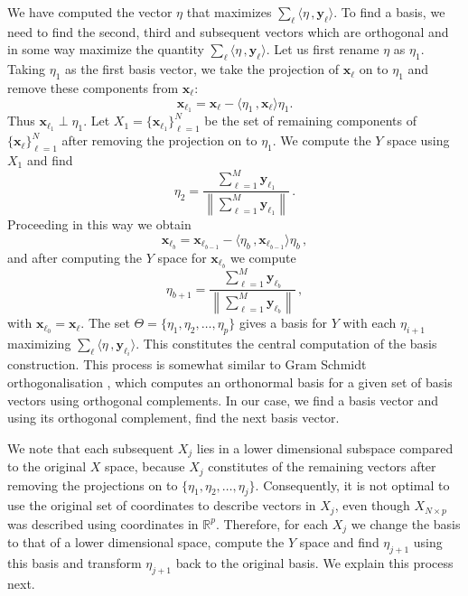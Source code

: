\documentclass[letter,12pt]{article}
\begin{document}
We have computed the vector $\eta$ that maximizes $\sum_{\ell}\langle \eta\, , \bm{y}_{\ell}\rangle$. To find a basis, we need to find the second, third and subsequent vectors which are orthogonal and in some way maximize the quantity $\sum_{\ell}\langle \eta\, , \bm{y}_{\ell}\rangle$. Let us first rename $\eta$ as $\eta_1$. {\color{blue} Taking $\eta_1$ as the first basis vector, we take the projection of $\bm{x}_\ell$ on to $\eta_1$ and remove these components from $\bm{x}_\ell$: 
\begin{equation}\label{eq:secMF10}
	\bm{x}_{\ell_1} = \bm{x}_\ell - \langle \eta_1 \, , \bm{x}_\ell \rangle \eta_1.
\end{equation}
Thus $\bm{x}_{\ell_1} \perp \eta_1$. Let $X_1 = \{\bm{x}_{\ell_1} \}_{\ell=1}^N $ be the set of remaining components of $\{ \bm{x}_\ell \}_{\ell=1}^N$ after removing the projection on to $\eta_1$. We compute the $Y$ space using $X_1$ and find  
\begin{equation}\label{eq:secMF111st}
	\eta_2 = \frac{\sum_{\ell=1}^M \bm{y}_{\ell_1} }{ \left\lVert\sum_{\ell=1}^M \bm{y}_{\ell_1} \right\rVert }\,.
\end{equation}
Proceeding in this way we obtain
\begin{equation}\label{eq:secMF12}
	\bm{x}_{\ell_{b}}  = \bm{x}_{\ell_{b-1}} - \langle \eta_b \, , \bm{x}_{\ell_{b-1}} \rangle \eta_b \, ,
\end{equation} 
and after computing the $Y$ space for $\bm{x}_{\ell_{b}}$ we compute
\begin{equation}\label{eq:secMF13}
    \eta_{b+1}  = \frac{\sum_{\ell=1}^M \bm{y}_{\ell_b} }{ \left\lVert\sum_{\ell=1}^M \bm{y}_{\ell_b} \right\rVert } \, ,
\end{equation}
with $\bm{x}_{\ell_0} = \bm{x}_{\ell}$. } The set $\Theta = \{ \eta_1, \eta_2, \dots , \eta_p \}$ gives a basis for $Y$ with each $\eta_{i+1}$ maximizing $\sum_{\ell}\langle \eta\, , \bm{y}_{\ell_i} \rangle$.
{\color{blue} This constitutes the central computation of the basis construction.}  This process is somewhat similar to Gram Schmidt orthogonalisation { \color{blue} \citep{anton2013elementary}, which computes an orthonormal basis for a  given set of basis vectors using orthogonal complements. In our case, we find a basis vector and using its orthogonal complement, find the next basis vector.  }

{\color{blue}
We note that each subsequent $X_j$ lies in a lower dimensional subspace compared to the original $X$ space, because $X_j$ constitutes of the remaining vectors after removing the projections on to $\{ \eta_1, \eta_2, \ldots , \eta_{j} \}$. Consequently, it is not optimal to use the original set of coordinates to describe vectors in $X_j$,  even though $X_{N \times p}$ was described using coordinates in $\mathbb{R}^p$. Therefore, for each $X_j$ we change the basis to that of a lower dimensional space, compute the $Y$ space and find $\eta_{j+1}$ using this basis and transform $\eta_{j+1}$ back to the original basis. We explain this process next.  

}
\end{document}
